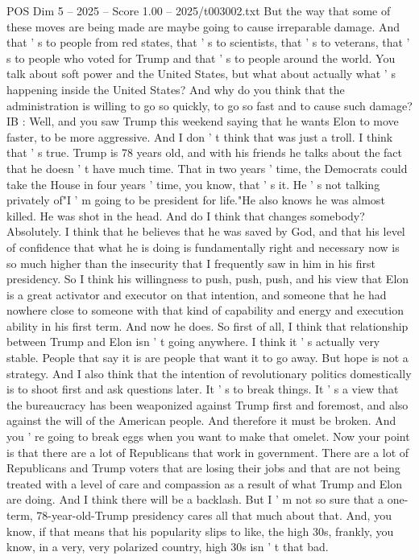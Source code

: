 \begin{textsample}{POS Dim 5 – 2025 – Score 1.00 – 2025/t003002.txt}
But the way that some of these moves are being made are maybe going to cause irreparable damage.
And that ' s to people from red states, that ' s to scientists, that ' s to veterans, that ' s to people who voted for Trump and that ' s to people around the world.
You talk about soft power and the United States, but what about actually what ' s happening inside the United States?
And why do you think that the administration is willing to go so quickly, to go so fast and to cause such damage?
IB : Well, and you saw Trump this weekend saying that he wants Elon to move faster, to be more aggressive.
And I don ' t think that was just a troll.
I think that ' s true.
Trump is 78 years old, and with his friends he talks about the fact that he doesn ' t have much time.
That in two years ' time, the Democrats could take the House in four years ' time, you know, that ' s it.
He ' s not talking privately of"I ' m going to be president for life."He also knows he was almost killed.
He was shot in the head.
And do I think that changes somebody?
Absolutely.
I think that he believes that he was saved by God, and that his level of confidence that what he is doing is fundamentally right and necessary now is so much higher than the insecurity that I frequently saw in him in his first presidency.
So I think his willingness to push, push, push, and his view that Elon is a great activator and executor on that intention, and someone that he had nowhere close to someone with that kind of capability and energy and execution ability in his first term.
And now he does.
So first of all, I think that relationship between Trump and Elon isn ' t going anywhere.
I think it ' s actually very stable.
People that say it is are people that want it to go away.
But hope is not a strategy.
And I also think that the intention of revolutionary politics domestically is to shoot first and ask questions later.
It ' s to break things.
It ' s a view that the bureaucracy has been weaponized against Trump first and foremost, and also against the will of the American people.
And therefore it must be broken.
And you ' re going to break eggs when you want to make that omelet.
Now your point is that there are a lot of Republicans that work in government.
There are a lot of Republicans and Trump voters that are losing their jobs and that are not being treated with a level of care and compassion as a result of what Trump and Elon are doing.
And I think there will be a backlash.
But I ' m not so sure that a one-term, 78-year-old-Trump presidency cares all that much about that.
And, you know, if that means that his popularity slips to like, the high 30s, frankly, you know, in a very, very polarized country, high 30s isn ' t that bad.

\end{textsample}
